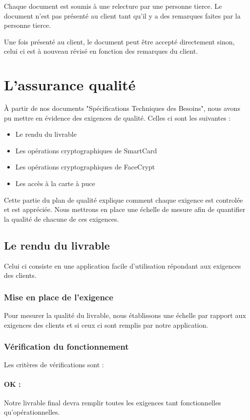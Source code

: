 \documentclass[a4paper,11pt,french]{article}
\begin{document}
	Chaque document est soumis à une relecture par une personne tierce.
Le document n'est pas présenté au client tant qu'il y a des remarques faites
par la personne tierce.

	Une fois présenté au client, le document peut être accepté directement
sinon, celui ci est à nouveau révisé en fonction des remarques du client.


\section{L'assurance qualité}

	À partir de nos documents "Spécifications Techniques des Besoins", nous
avons pu mettre en évidence des exigences de qualité. Celles ci sont les
suivantes :
\begin{itemize}
	\item Le rendu du livrable
	\item Les opérations cryptographiques de SmartCard
	\item Les opérations cryptographiques de FaceCrypt
	\item Les accès à la carte à puce
\end{itemize}

	Cette partie du plan de qualité explique comment chaque exigence est
controlée et est appréciée. Nous mettrons en place une échelle de mesure afin
de quantifier la qualité de chacune de ces exigences.

\newpage
\subsection{Le rendu du livrable}
	Celui ci consiste en une application facile d'utilisation répondant
aux exigences des clients.
\subsubsection{Mise en place de l'exigence}
	Pour mesurer la qualité du livrable, nous établissons une échelle
par rapport aux exigences des clients et si ceux ci sont remplis par notre
application.
\subsubsection{Vérification du fonctionnement}
	Les critères de vérifications sont :
\paragraph{OK : } Notre livrable final devra remplir toutes les exigences tant
fonctionnelles qu'opérationnelles.
\end{document}
